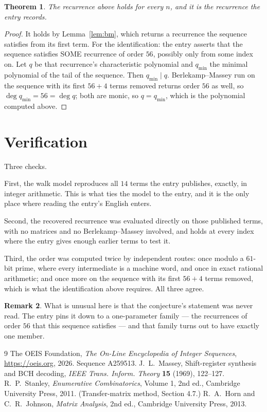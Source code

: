 \documentclass[11pt,a4paper]{article}
\theoremstyle{plain}
\newtheorem{theorem}{Theorem}
\theoremstyle{definition}
\newtheorem{remark}[theorem]{Remark}
\begin{document}
\begin{theorem}
The recurrence above holds for every $n$, and it is the recurrence the entry records.
\end{theorem}

\begin{proof}
It holds by Lemma~\ref{lem:bm}, which returns a recurrence the sequence satisfies from its
first term. For the identification: the entry asserts that the sequence satisfies SOME
recurrence of order $56$, possibly only from some index on. Let $q$ be that recurrence's
characteristic polynomial and $q_{\min}$ the minimal polynomial of the tail of the sequence.
Then $q_{\min}\mid q$. Berlekamp--Massey run on the sequence with its first $56+4$ terms
removed returns order $56$ as well, so $\deg q_{\min}=56=\deg q$; both are monic, so
$q=q_{\min}$, which is the polynomial computed above.
\end{proof}

\section{Verification}

Three checks.

First, the walk model reproduces all $14$ terms the entry publishes, exactly, in integer
arithmetic. This is what ties the model to the entry, and it is the only place where reading
the entry's English enters.

Second, the recovered recurrence was evaluated directly on those published terms, with no
matrices and no Berlekamp--Massey involved, and holds at every index where the entry gives
enough earlier terms to test it.

Third, the order was computed twice by independent routes: once modulo a $61$-bit prime, where
every intermediate is a machine word, and once in exact rational arithmetic; and once more on
the sequence with its first $56+4$ terms removed, which is what the identification above
requires. All three agree.

\begin{remark}
What is unusual here is that the conjecture's statement was never read. The entry pins it down
to a one-parameter family --- the recurrences of order $56$ that this sequence satisfies
--- and that family turns out to have exactly one member.
\end{remark}

\begin{thebibliography}{9}
 The OEIS Foundation, \emph{The On-Line Encyclopedia of Integer
Sequences}, \url{https://oeis.org}, 2026. Sequence A259513.
 J.~L.~Massey, Shift-register synthesis and BCH decoding, \emph{IEEE
Trans. Inform. Theory} \textbf{15} (1969), 122--127.
 R.~P.~Stanley, \emph{Enumerative Combinatorics}, Volume 1, 2nd ed.,
Cambridge University Press, 2011. (Transfer-matrix method, Section 4.7.)
 R.~A.~Horn and C.~R.~Johnson, \emph{Matrix Analysis}, 2nd ed., Cambridge
University Press, 2013.
\end{thebibliography}
\end{document}
